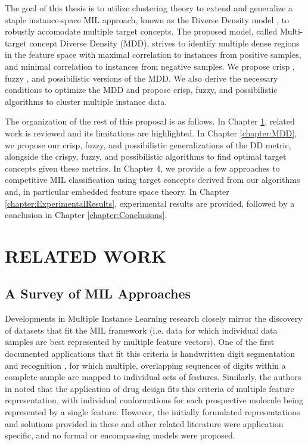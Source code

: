 \documentclass[12pt,dvips]{report}
\numberwithin{equation}{section}
\begin{document}
The goal of this thesis is to utilize clustering theory \cite{kaufman2009finding} to extend and generalize a staple instance-space MIL approach, known as the Diverse Density model \cite{maro98}, to robustly accomodate multiple target concepts. The proposed model, called Multi-target concept Diverse Density (MDD), strives to identify multiple dense regions in the feature space with maximal correlation to instances from positive samples, and minimal correlation to instances from negative samples. We propose crisp \cite{kaufman2009finding}, fuzzy \cite{bezdek1981}, and possibilistic \cite{PCM} versions of the MDD.  We also derive the necessary conditions to optimize the MDD and propose crisp, fuzzy, and possibilistic algorithms to cluster multiple instance data.

The organization of the rest of this proposal is as follows. In Chapter \ref{chapter:RelatedWork}, related work is reviewed and its limitations are highlighted. In Chapter \ref{chapter:MDD}, we propose our crisp, fuzzy, and possibilistic generalizations of the DD metric, alongside the crispy, fuzzy, and possibilistic algorithms to find optimal target concepts given these metrics.  In Chapter 4, we provide a few approaches to competitive MIL classification using target concepts derived from our algorithms and, in particular embedded feature space theory.  In Chapter \ref{chapter:ExperimentalResults}, experimental results are provided, followed by a conclusion in Chapter \ref{chapter:Conclusions}.


\chapter{RELATED WORK} \label{chapter:RelatedWork}

\section{A Survey of MIL Approaches}

Developments in Multiple Instance Learning research closely mirror the discovery of datasets that fit the MIL framework (i.e. data for which individual data samples are best represented by multiple feature vectors). One of the first documented applications that fit this criteria is handwritten digit segmentation and recognition \cite{keeler1990,rumelhart1985feature}, for which multiple, overlapping sequences of digits within a complete sample are mapped to individual sets of features.  Similarly, the authors in \cite{crippen1988} noted that the application of drug design fits this criteria of multiple feature representation, with individual conformations for each prospective molecule being represented by a single feature.  However, the initially forumlated representations and solutions provided in these and other related literature were application specific, and no formal or encompassing models were proposed.
\end{document}
